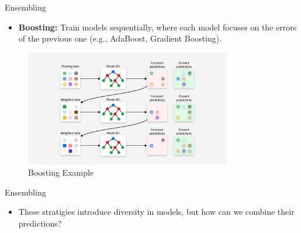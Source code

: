\documentclass[10pt]{beamer}
\theoremstyle{remark}
\theoremstyle{definition}
\begin{document}
\begin{frame}{Ensembling}
\begin{itemize}
    \begin{itemize}
        \item \textbf{Boosting:} Train models sequentially, where each model focuses on the errors of the previous one (e.g., AdaBoost, Gradient Boosting).
    \end{itemize}
    \end{itemize}
    \begin{figure}
    \centering
    \includegraphics[width=0.8\textwidth,height=0.8\textheight,keepaspectratio]{./images/boosting.png}
    \caption{Boosting Example}
\end{figure}
\end{frame}

\begin{frame}{Ensembling}
\begin{itemize}
\item These stratigies introduce diversity in models, but how can we combine their predictions?
\end{itemize}
\end{frame}
\end{document}
